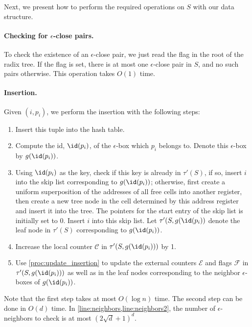 Next, we present how to perform the required operations on $S$ with our data structure.

\paragraph{Checking for $\epsilon$-close pairs.}To check the existence of an $\epsilon$-close pair, we just read the flag in the root of the radix tree. If the flag is set, there is at most one $\epsilon$-close pair in $S$, and no such pairs otherwise. This operation takes $O(1)$ time.

\paragraph{Insertion.} 
Given $(i, p_i)$, we perform the insertion with the following steps:
\begin{enumerate}
  \item Insert this tuple into the hash table.
  \item Compute the id, $\id(p_i)$, of the $\epsilon$-box which $p_i$ belongs to. Denote this $\epsilon$-box by $g(\id(p_i))$.
  \item Using $\id(p_i)$ as the key, check if this key is already in $\tau'(S)$, if so, insert $i$ into the skip list corresponding to $g(\id(p_i))$; otherwise, first create a uniform superposition of the addresses of all free cells into another register, then create a new tree node in the cell determined by this address register and insert it into the tree. The pointers for the start entry of the skip list is initially set to 0. Insert $i$ into this skip list. Let $\tau'(S, g(\id(p_i))$ denote the leaf node in $\tau'(S)$ corresponding to $g(\id(p_i))$.
  \item Increase the local counter $\mathcal{C}$ in $\tau'(S, g(\id(p_i)))$ by 1.
  \item Use \cref{proc:update_insertion} to update the external counters $\mathcal{E}$ and flags $\mathcal{F}$ in $\tau'(S, g(\id(p_i)))$ as well as in the leaf nodes corresponding to the neighbor $\epsilon$-boxes of $g(\id(p_i))$.
\end{enumerate}

Note that the first step takes at most $O(\log n)$ time. The second step can be done in $O(d)$ time. In \cref{line:neighbors,line:neighbors2}, the number of $\epsilon$-neighbors to check is at most $(2\sqrt{d}+1)^d$.

